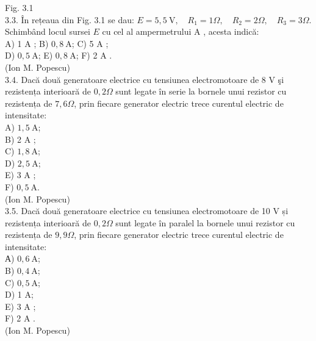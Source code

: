 \documentclass[10pt]{article}
\begin{document}
Fig. 3.1\\
3.3. În rețeaua din Fig. 3.1 se dau: $E=5,5 \mathrm{~V}, \quad R_{1}=1 \Omega, \quad R_{2}=2 \Omega, \quad R_{3}=3 \Omega$. Schimbând locul sursei $E$ cu cel al ampermetrului A , acesta indică:\\
A) 1 A ; B) $0,8 \mathrm{~A}$; C) 5 A ;\\
D) $0,5 \mathrm{~A}$; E) $0,8 \mathrm{~A}$; F) 2 A .\\
(Ion M. Popescu)\\
3.4. Dacă două generatoare electrice cu tensiunea electromotoare de 8 V şi rezistența interioară de $0,2 \Omega$ sunt legate în serie la bornele unui rezistor cu rezistența de $7,6 \Omega$, prin fiecare generator electric trece curentul electric de intensitate:\\
A) $1,5 \mathrm{~A}$;\\
B) 2 A ;\\
C) $1,8 \mathrm{~A}$;\\
D) $2,5 \mathrm{~A}$;\\
E) 3 A ;\\
F) $0,5 \mathrm{~A}$.\\
(Ion M. Popescu)\\
3.5. Dacă două generatoare electrice cu tensiunea electromotoare de 10 V și rezistența interioară de $0,2 \Omega$ sunt legate în paralel la bornele unui rezistor cu rezistența de $9,9 \Omega$, prin fiecare generator electric trece curentul electric de intensitate:\\
А) $0,6 \mathrm{~A}$;\\
B) $0,4 \mathrm{~A}$;\\
C) $0,5 \mathrm{~A}$;\\
D) 1 A;\\
E) 3 A ;\\
F) 2 A .\\
(Ion M. Popescu)
\end{document}
